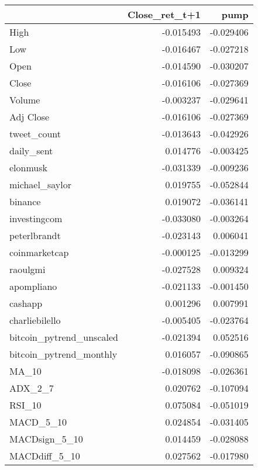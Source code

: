 \begin{tabular}{lrr}
\toprule
{} &  Close\_ret\_t+1 &      pump \\
\midrule
High                     &      -0.015493 & -0.029406 \\
Low                      &      -0.016467 & -0.027218 \\
Open                     &      -0.014590 & -0.030207 \\
Close                    &      -0.016106 & -0.027369 \\
Volume                   &      -0.003237 & -0.029641 \\
Adj Close                &      -0.016106 & -0.027369 \\
tweet\_count              &      -0.013643 & -0.042926 \\
daily\_sent               &       0.014776 & -0.003425 \\
elonmusk                 &      -0.031339 & -0.009236 \\
michael\_saylor           &       0.019755 & -0.052844 \\
binance                  &       0.019072 & -0.036141 \\
investingcom             &      -0.033080 & -0.003264 \\
peterlbrandt             &      -0.023143 &  0.006041 \\
coinmarketcap            &      -0.000125 & -0.013299 \\
raoulgmi                 &      -0.027528 &  0.009324 \\
apompliano               &      -0.021133 & -0.001450 \\
cashapp                  &       0.001296 &  0.007991 \\
charliebilello           &      -0.005405 & -0.023764 \\
bitcoin\_pytrend\_unscaled &      -0.021394 &  0.052516 \\
bitcoin\_pytrend\_monthly  &       0.016057 & -0.090865 \\
MA\_10                    &      -0.018098 & -0.026361 \\
ADX\_2\_7                  &       0.020762 & -0.107094 \\
RSI\_10                   &       0.075084 & -0.051019 \\
MACD\_5\_10                &       0.024854 & -0.031405 \\
MACDsign\_5\_10            &       0.014459 & -0.028088 \\
MACDdiff\_5\_10            &       0.027562 & -0.017980 \\

\end{tabular}
